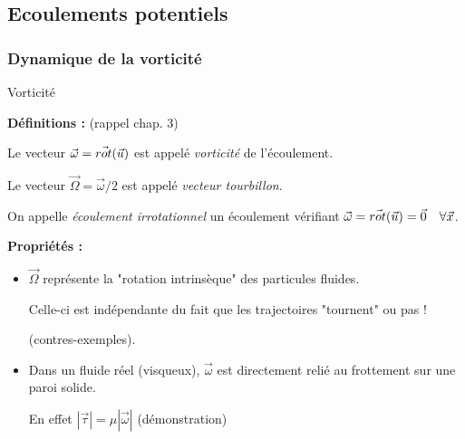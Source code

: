\subsection{Ecoulements potentiels}


\subsubsection{Dynamique de la vorticité}

\begin{frame}{Vorticité} \hypertarget{frame:toto}{}


\small

{\bf Définitions :} (rappel chap. 3) 


Le vecteur $\vec{\omega} = \vec{rot} ( \vec{u} ) $ est appelé {\em vorticité} de l'écoulement. 

Le vecteur $\vec \Omega = \vec \omega /2$ est appelé {\em vecteur tourbillon}.

On appelle {\em écoulement irrotationnel } un écoulement vérifiant  $\vec{\omega} = \vec{rot}(\vec{u}) = \vec 0 \quad \forall \vec x$.



\medskip

{\bf Propriétés :} 

\begin{itemize}
\item $\vec \Omega$ représente la "rotation intrinsèque" des particules fluides. 

Celle-ci est indépendante du fait que les trajectoires "tournent" ou pas ! 

(contres-exemples).


\item Dans un fluide réel (visqueux), $\vec \omega$ est directement relié au frottement sur une paroi solide. 

En effet $| \vec \tau | =  \mu | \vec \omega | $ (démonstration)

\end{itemize} 



\end{frame}

